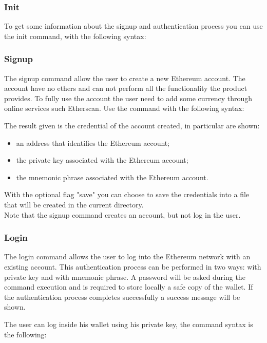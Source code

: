 \subsubsection{Init}
To get some information about the signup and authentication process you can use the init command, with the following syntax:
\begin{center}
\end{center}

\subsubsection{Signup}
The signup command allow the user to create a new Ethereum account. The account have no ethers and can not perform all the functionality the product provides.
To fully use the account the user need to add some currency through online services such Etherscan.
Use the command with the following syntax:

\begin{center}
\end{center}

\noindent The result given is the credential of the account created, in particular are shown:
\begin{itemize}
	\item an address that identifies the Ethereum account;
	\item the private key associated with the Ethereum account;
	\item the mnemonic phrase associated with the Ethereum account.
\end{itemize}
With the optional flag "save" you can choose to save the credentials into a file that will be created in the current directory. \\
Note that the signup command creates an account, but not log in the user.

\subsubsection{Login}
The login command allows the user to log into the Ethereum network with an existing account.
This authentication process can be performed in two ways: with private key and with mnemonic phrase.
A password will be asked during the command execution and is required to store locally a safe copy of the wallet. If the authentication process completes successfully a success message will be shown.

The user can log inside his wallet using his private key, the command syntax is the following: \\
\begin{center}
\end{center}

